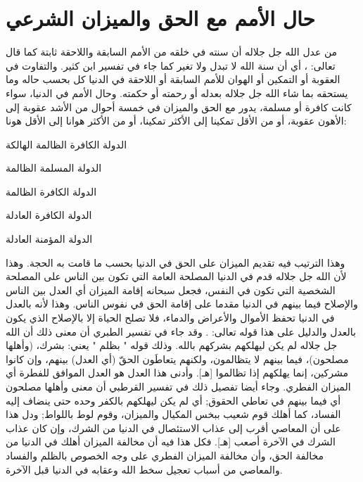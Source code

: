 \section{حال الأمم مع الحق والميزان الشرعي}

من عدل الله جل جلاله أن سنته في خلقه من الأمم السابقة واللاحقة ثابتة كما قال تعالى: \quranayah*[33][62]{\footnotesize \surahname*[33]}، أي أن سنة الله لا تبدل ولا تغير كما جاء في تفسير ابن كثير. والتفاوت في العقوبة أو التمكين أو الهوان للأمم السابقة أو اللاحقة في الدنيا كل بحسب حاله وما يستحقه بما شاء الله جل جلاله بعدله أو رحمته أو حكمته. وحال الأمم في الدنيا، سواء كانت كافرة أو مسلمة،  يدور مع الحق والميزان في خمسة أحوال من الأشد عقوبة إلى الأهون عقوبة، أو من الأقل تمكينا إلى الأكثر تمكينا، أو من الأكثر هوانا إلى الأقل هونا:

\begin{compactitem}
    \item الدولة الكافرة الظالمة الهالكة
    \item الدولة المسلمة الظالمة
    \item الدولة الكافرة الظالمة
    \item الدولة الكافرة العادلة
    \item الدولة المؤمنة العادلة
\end{compactitem}

وهذا الترتيب فيه تقديم الميزان على الحق في الدنيا بحسب ما قامت به الحجة. وهذا لأن الله جل جلاله قدم في الدنيا المصلحة العامة التي تكون بين الناس على المصلحة الشخصية التي تكون في النفس، فجعل سبحانه إقامة الميزان أي العدل بين الناس والإصلاح فيما بينهم في الدنيا مقدما على إقامة الحق في نفوس الناس. وهذا لأنه بالعدل في الدنيا تحفظ الأموال والأعراض والدماء، فلا تصلح الحياة إلا بالإصلاح الذي يكون بالعدل والدليل على هذا قوله تعالى: \quranayah*[11][117]{\footnotesize \surahname*[11]}. وقد جاء في تفسير الطبري أن معنى ذلك أن الله جل جلاله لم يكن ليهلكهم بشركهم بالله. وذلك قوله " بظلم " يعني: بشرك، (وأهلها مصلحون)، فيما بينهم لا يتظالمون، ولكنهم يتعاطَون الحقّ (أي العدل) بينهم، وإن كانوا مشركين، إنما يهلكهم إذا تظالموا [هـ]. وأدنى هذا العدل هو العدل الموافق للفطرة أي الميزان الفطري. وجاء أيضا تفصيل ذلك في تفسير القرطبي أن معنى وأهلها مصلحون أي فيما بينهم في تعاطي الحقوق; أي لم يكن ليهلكهم بالكفر وحده حتى ينضاف إليه الفساد، كما أهلك قوم شعيب ببخس المكيال والميزان، وقوم لوط باللواط; ودل هذا على أن المعاصي أقرب إلى عذاب الاستئصال في الدنيا من الشرك، وإن كان عذاب الشرك في الآخرة أصعب [هـ]. فكل هذا فيه أن مخالفة الميزان أهلك في الدنيا من مخالفة الحق، وأن مخالفة الميزان الفطري على وجه الخصوص بالظلم والفساد والمعاصي من أسباب تعجيل سخط الله وعقابه في الدنيا قبل الآخرة. 


